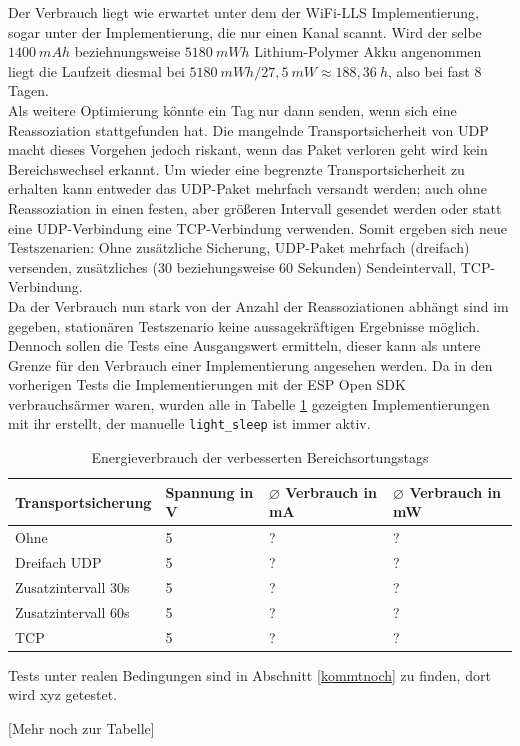 Der Verbrauch liegt wie erwartet unter dem der WiFi-LLS Implementierung, sogar unter der Implementierung, die nur einen Kanal scannt.
Wird der selbe $1400\ mAh$ beziehnungsweise $5180\ mWh$ Lithium-Polymer Akku angenommen liegt die Laufzeit diesmal  bei $5180\ mWh/27,5\ mW \approx 188,36\ h$, also bei fast 8 Tagen. \\
Als weitere Optimierung könnte ein Tag nur dann senden, wenn sich eine Reassoziation stattgefunden hat.
Die mangelnde Transportsicherheit von UDP macht dieses Vorgehen jedoch riskant, wenn das Paket verloren geht wird kein Bereichswechsel erkannt.
Um wieder eine begrenzte Transportsicherheit zu erhalten kann entweder das UDP-Paket mehrfach versandt werden; auch ohne Reassoziation in einen festen, aber größeren Intervall gesendet werden oder statt eine UDP-Verbindung eine TCP-Verbindung verwenden.
Somit ergeben sich neue Testszenarien: Ohne zusätzliche Sicherung, UDP-Paket mehrfach (dreifach) versenden, zusätzliches (30 beziehungsweise 60 Sekunden) Sendeintervall, TCP-Verbindung. \\
Da der Verbrauch nun stark von der Anzahl der Reassoziationen abhängt sind im gegeben, stationären Testszenario keine aussagekräftigen Ergebnisse möglich.
Dennoch sollen die Tests eine Ausgangswert ermitteln, dieser kann als untere Grenze für den Verbrauch einer Implementierung angesehen werden.
Da in den vorherigen Tests die Implementierungen mit der ESP Open SDK verbrauchsärmer waren, wurden alle in Tabelle \ref{table:naiveoptconsumption} gezeigten Implementierungen mit ihr erstellt, der manuelle \texttt{light\_sleep} ist immer aktiv.

\begin{table}[h]
	\centering
	\caption{Energieverbrauch der verbesserten Bereichsortungstags}
	\label{table:naiveoptconsumption}
	\begin{tabular}{p{3.5cm}|p{1.7cm}|p{2.5cm}|p{2.5cm}}
		Transportsicherung & Spannung in V & $\varnothing$ Verbrauch in mA & $\varnothing$ Verbrauch in mW \\
		\hline
		Ohne & 5 & ? & ? \\
		Dreifach UDP & 5 & ? & ? \\
		Zusatzintervall 30s & 5 & ? & ? \\
		Zusatzintervall 60s & 5 & ? & ? \\
		TCP & 5 & ? & ? \\
	\end{tabular}
\end{table}

Tests unter realen Bedingungen sind in Abschnitt \ref{kommtnoch} zu finden, dort wird xyz getestet.

[Mehr noch zur Tabelle]

